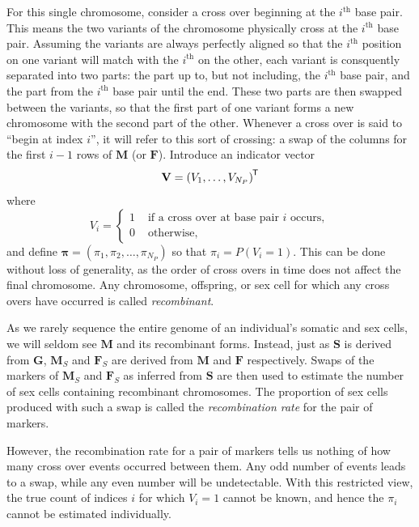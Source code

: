 \documentclass[12pt]{article}
\newcommand{\ve}[1]{\mathbf{#1}}           %
\newcommand{\sv}[1]{\boldsymbol{#1}}   %
\newcommand{\m}[1]{\mathbf{#1}}               %
\newcommand{\tr}[1]{{#1}^{\mkern-1.5mu\mathsf{T}}}              %
\begin{document}
For this single chromosome, consider a cross over beginning at the $i^{\text{th}}$ base pair. This means the two variants of the chromosome physically cross at the $i^{\text{th}}$ base pair. Assuming the variants are always perfectly aligned so that the $i^{\text{th}}$ position on one variant will match with the $i^{\text{th}}$ on the other, each variant is consquently separated into two parts: the part up to, but not including, the $i^{\text{th}}$ base pair, and the part from the $i^{\text{th}}$ base pair until the end. These two parts are then swapped between the variants, so that the first part of one variant forms a new chromosome with the second part of the other. Whenever a cross over is said to ``begin at index $i$'', it will refer to this sort of crossing: a swap of the columns for the first $i-1$ rows of $\m{M}$ (or $\m{F}$). Introduce an indicator vector
$$\ve{V} = \tr{(V_1, \dots, V_{N_P})}$$
where
\begin{equation} \label{eq:crossindicator}
V_i = \begin{cases}
  1 & \text{ if a cross over at base pair } i \text{ occurs}, \\
  0 & \text{ otherwise},
\end{cases}
\end{equation}
and define $\sv{\pi} = (\pi_1, \pi_2, \dots, \pi_{N_P})$ so that $\pi_i = P(V_i = 1)$. This can be done without loss of generality, as the order of cross overs in time does not affect the final chromosome. Any chromosome, offspring, or sex cell for which any cross overs have occurred is called \textit{recombinant}.

As we rarely sequence the entire genome of an individual's somatic and sex cells, we will seldom see $\m{M}$ and its recombinant forms. Instead, just as $\m{S}$ is derived from $\m{G}$, $\m{M}_S$ and $\m{F}_S$ are derived from $\m{M}$ and $\m{F}$ respectively. Swaps of the markers of $\m{M}_S$ and $\m{F}_S$ as inferred from $\m{S}$ are then used to estimate the number of sex cells containing recombinant chromosomes. The proportion of sex cells produced with such a swap is called the \textit{recombination rate} for the pair of markers.

However, the recombination rate for a pair of markers tells us nothing of how many cross over events occurred between them. Any odd number of events leads to a swap, while any even number will be undetectable. With this restricted view, the true count of indices $i$ for which $V_i = 1$ cannot be known, and hence the $\pi_i$ cannot be estimated individually.
\end{document}
